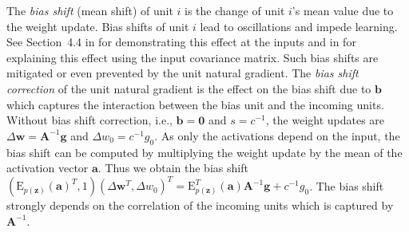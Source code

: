 \documentclass{article}
\newcommand\Ba{\bm{a}}
\newcommand\Bb{\bm{b}}
\newcommand\Bg{\bm{g}}
\newcommand\Bw{\bm{w}}
\newcommand\Bz{\bm{z}}
\newcommand\BA{\bm{A}}
\newcommand\BZe{\bm{0}}
\newcommand\EXP{\mathbf{\mathrm{E}}}
\begin{document}
The {\em bias shift} (mean shift) of unit $i$ is the change of unit $i$'s
mean value due to the weight update. Bias shifts of unit $i$
lead to oscillations and impede learning. See Section~4.4 in \citet{LeCun:98} for
demonstrating this effect at the inputs and in \citet{LeCun:91} for explaining
this effect using the input covariance matrix.
Such bias shifts are mitigated or even prevented
by the unit natural gradient.
The {\em bias shift correction} of the unit natural gradient is the
effect on the bias shift due to $\Bb$ which captures
the interaction between the bias unit and the incoming units.
Without bias shift correction, i.e., $\Bb=\BZe$ and $s=c^{-1}$,
the weight updates are $\Delta \Bw=\BA^{-1}\Bg$ and $\Delta w_0 = c^{-1} g_0$.
As only the activations
depend on the input, the bias shift can be computed by multiplying the weight
update by the mean of the activation vector $\Ba$.
Thus we obtain the bias shift
$(\EXP_{p(\Bz)} (\Ba)^T ,1) (\Delta \Bw^T, \Delta w_0)^T=
\EXP_{p(\Bz)}^T (\Ba) \BA^{-1}\Bg + c^{-1} g_0$.
The bias shift strongly depends on the correlation of the incoming
units which is captured by $\BA^{-1}$.
\end{document}
